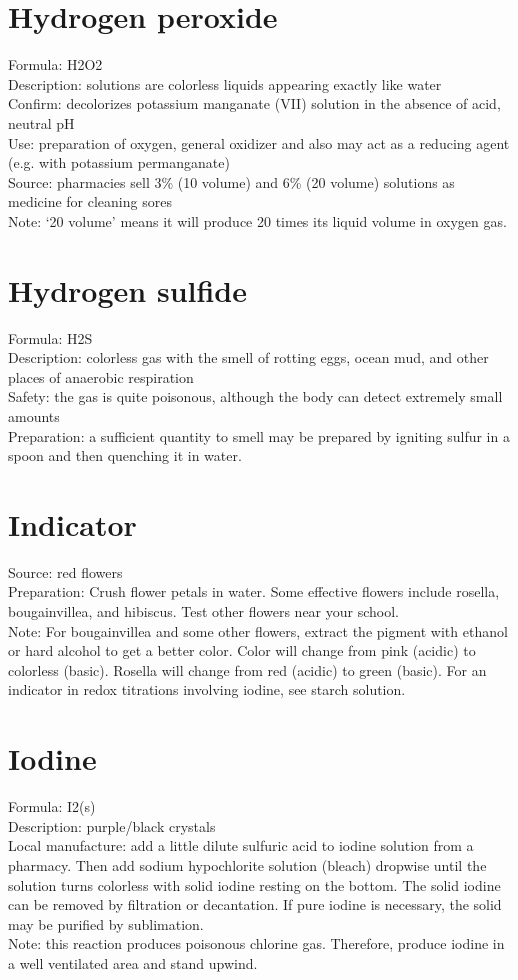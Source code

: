 \section{Hydrogen peroxide}
Formula: H2O2\\
Description: solutions are colorless liquids 
appearing exactly like water\\
Confirm: decolorizes potassium manganate (VII) solution 
in the absence of acid, 
neutral pH\\
Use: preparation of oxygen, 
general oxidizer and also may act as a reducing agent (e.g. 
with potassium permanganate)\\
Source: pharmacies sell 3\% (10 volume) and 6\% (20 volume) solutions 
as medicine for cleaning sores\\
Note: ‘20 volume’ means it will produce 20 times its liquid volume in oxygen gas.

\section{Hydrogen sulfide}
Formula: H2S\\
Description: colorless gas with the smell of rotting eggs, 
ocean mud, 
and other places of anaerobic respiration\\
Safety: the gas is quite poisonous, 
although the body can detect extremely small amounts\\
Preparation: a sufficient quantity to smell 
may be prepared by igniting sulfur in a spoon 
and then quenching it in water.

\section{Indicator}
Source: red flowers\\
Preparation: Crush flower petals in water. 
Some effective flowers include rosella, 
bougainvillea, 
and hibiscus. 
Test other flowers near your school.\\
Note: For bougainvillea and some other flowers, 
extract the pigment with ethanol 
or hard alcohol to get a better color. 
Color will change from pink (acidic) to colorless (basic). 
Rosella will change from red (acidic) to green (basic).
For an indicator in redox titrations involving iodine, 
see starch solution.

\section{Iodine}
Formula: I2(s)\\
Description: purple/black crystals\\
Local manufacture: add a little dilute sulfuric acid 
to iodine solution from a pharmacy. 
Then add sodium hypochlorite solution (bleach) dropwise 
until the solution turns colorless with solid iodine resting on the bottom. 
The solid iodine can be removed by filtration or decantation. 
If pure iodine is necessary, 
the solid may be purified by sublimation.\\
Note: this reaction produces poisonous chlorine gas. 
Therefore, 
produce iodine in a well ventilated area and stand upwind.

